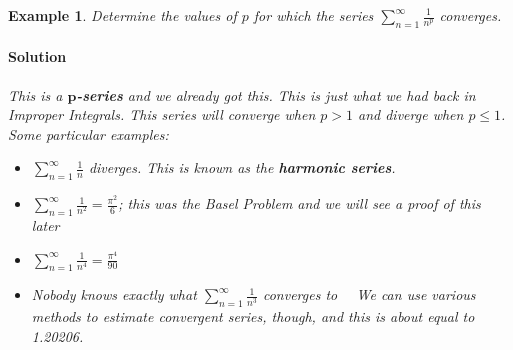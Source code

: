 \documentclass[letterpaper, 11pt, openany]{book}
\theoremstyle{mytheoremstyle}
\theoremstyle{myexamplestyle}
\newtheorem{example}{Example}[section]
\newenvironment{solution}{\paragraph{\sffamily \smaller \fontseries{b}\selectfont Solution}}{\hfill\faSquare}
\begin{document}
\begin{example}\label{e:seriesinttestpseries}
    Determine the values of $p$ for which the series  $\displaystyle \sum_{n=1}^{\infty} \frac{1}{n^{p}}$ converges.
    
    \begin{solution}
        This is a $\bm{p}$\textbf{-series} and we already got this. This is just what we had back in Improper Integrals. This series will converge when $p>1$ and diverge when $p \leq 1$.
        Some particular examples:
        \begin{itemize}
            \item $\displaystyle \sum_{n=1}^{\infty} \frac{1}{n}$ diverges. This is known as the \textbf{harmonic series}.
            \item $\displaystyle \sum_{n=1}^{\infty} \frac{1}{n^{2}} = \frac{\pi^{2}}{6}$; this was the Basel Problem and we will see a proof of this later
            \item $\displaystyle \sum_{n=1}^{\infty} \frac{1}{n^{4}} = \frac{\pi^{4}}{90}$
            \item Nobody knows exactly what $\displaystyle \sum_{n=1}^{\infty} \frac{1}{n^{3}}$ converges to \ \faFrown \ We can use various methods to estimate convergent series, though, and this is about equal to 1.20206.
        \end{itemize}
    \end{solution}
\end{example}
\end{document}
